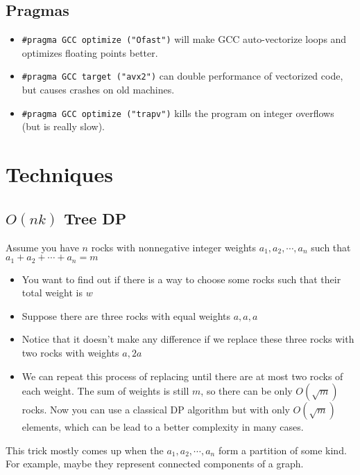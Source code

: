 	\subsection{Pragmas}
		\begin{itemize}
			\item \lstinline{#pragma GCC optimize ("Ofast")} will make GCC auto-vectorize loops and optimizes floating points better.
			\item \lstinline{#pragma GCC target ("avx2")} can double performance of vectorized code, but causes crashes on old machines.
			\item \lstinline{#pragma GCC optimize ("trapv")} kills the program on integer overflows (but is really slow).
		\end{itemize}
\section{Techniques}

\subsection{$O(nk)$ Tree DP}
Assume you have $n$ rocks with nonnegative integer weights $a_1,a_2,\cdots,a_n$ such that $a_1+a_2+\cdots+a_n=m$
\begin{itemize}
\item You want to find out if there is a way to choose some rocks such that their total weight is $w$
\item Suppose there are three rocks with equal weights $a,a,a$
\item Notice that it doesn't make any difference if we replace these three rocks with two rocks with weights $a,2a$
\item We can repeat this process of replacing until there are at most two rocks of each weight. The sum of weights is still $m$,
so there can be only $O(\sqrt{m})$ rocks. Now you can use a classical DP algorithm but with only $O(\sqrt{m})$
elements, which can be lead to a better complexity in many cases.
\end{itemize}
This trick mostly comes up when the $a_1,a_2,\cdots,a_n$ form a partition of some kind. 
For example, maybe they represent connected components of a graph.
